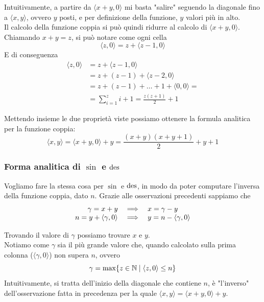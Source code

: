 Intuitivamente, a partire da $\langle x + y, 0\rangle$ mi basta "salire" seguendo la diagonale fino a $\langle x,y \rangle$, ovvero $y$ posti, e per definizione della funzione, $y$ valori più in alto.\\

Il calcolo della funzione coppia si può quindi ridurre al calcolo di $\langle x + y, 0\rangle$. Chiamando $x + y = z$, si può notare come ogni cella 
$$ \langle z,0 \rangle = z + \langle z - 1, 0 \rangle $$
E di conseguenza
\begin{align*}
	\langle z,0 \rangle & = z + \langle z - 1, 0 \rangle \\
	& = z + (z-1) + \langle z-2, 0 \rangle \\
	& = z + (z-1) + \dots + 1 + \langle 0,0 \rangle = \\
	& = \sum_{i=1}^{z} i + 1 = \frac{z(z+1)}{2} + 1
\end{align*}

Mettendo insieme le due proprietà viste possiamo ottenere la formula analitica per la funzione coppia: 
$$ \langle x,y \rangle = \langle x + y, 0 \rangle + y = \frac{(x + y) (x + y + 1)}{2} + y + 1 $$

\subsubsection{Forma analitica di $\sin$ e $\operatorname{des}$} 
Vogliamo fare la stessa cosa per $\sin$ e $\operatorname{des}$, in modo da poter computare l'inversa della funzione coppia, dato $n$. Grazie alle osservazioni precedenti sappiamo che
$$ \begin{array}{r c l}
	\gamma = x + y & \implies & x = \gamma - y \\
	n = y + \langle \gamma , 0 \rangle & \implies & y = n - \langle \gamma , 0 \rangle \\
\end{array} $$

Trovando il valore di $\gamma$ possiamo trovare $x$ e $y$. \\

Notiamo come $\gamma$ sia il più grande valore che, quando calcolato sulla prima colonna ($\langle \gamma, 0 \rangle$) non supera $n$, ovvero
$$ \gamma = \max \{z \in \mathbb{N} \mid \langle z, 0 \rangle \leq n \} $$
Intuitivamente, si tratta dell'inizio della diagonale che contiene $n$, è "l'inverso" dell'osservazione fatta in precedenza per la quale $ \langle x,y \rangle = \langle x + y,0 \rangle + y $.\\

